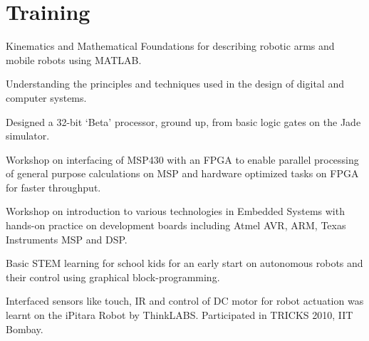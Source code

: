 \documentclass[]{deedy-resume-openfont}
\begin{document}

\section{Training}

\begin{tightemize}
\item Kinematics and Mathematical Foundations for describing robotic arms and mobile robots using MATLAB.
\end{tightemize}
\sectionsep

\begin{tightemize}
\item Understanding the principles and techniques used in the design of digital and computer systems. \item Designed a 32-bit ‘Beta’ processor, ground up, from basic logic gates on the Jade simulator.
\end{tightemize}
\sectionsep

\begin{tightemize}
\item Workshop on interfacing of MSP430 with an FPGA to enable parallel processing of general purpose calculations on MSP and hardware optimized tasks on FPGA for faster throughput.
\end{tightemize}
\sectionsep

\begin{tightemize}
	\item Workshop on introduction to various technologies in Embedded Systems with	hands-on practice on development boards including Atmel AVR, ARM, Texas Instruments MSP and DSP.
\end{tightemize}
\sectionsep

\begin{tightemize}
	\item Basic STEM learning for school kids for an early start on autonomous robots and their control using graphical block-programming. 
	\item Interfaced sensors like touch, IR and control of DC motor for robot actuation was learnt on the iPitara Robot by ThinkLABS. Participated in TRICKS 2010, IIT Bombay.
\end{tightemize}
\sectionsep
\end{document}
